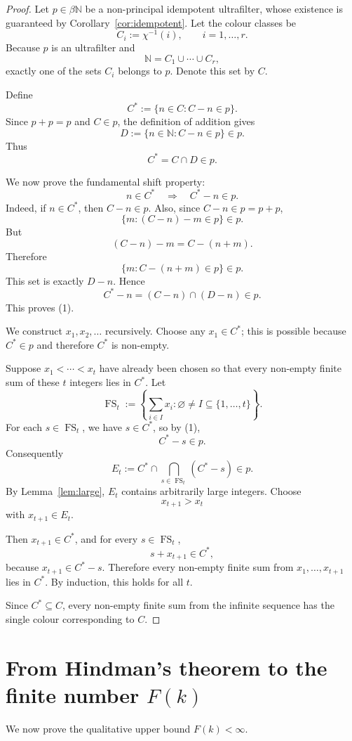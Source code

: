 \documentclass[11pt]{article}
\newcommand{\NN}{\mathbb N}
\newcommand{\FS}{\operatorname{FS}}
\begin{document}
\begin{proof}
Let $p\in\beta\NN$ be a non-principal idempotent ultrafilter, whose existence is guaranteed by Corollary~\ref{cor:idempotent}. Let the colour classes be
\[
    C_i:=\chi^{-1}(i),\qquad i=1,
\ldots,r.
\]
Because $p$ is an ultrafilter and
\[
    \NN=C_1\cup\cdots\cup C_r,
\]
exactly one of the sets $C_i$ belongs to $p$. Denote this set by $C$.

Define
\[
    C^*:=\{n\in C:C-n\in p\}.
\]
Since $p+p=p$ and $C\in p$, the definition of addition gives
\[
    D:=\{n\in\NN:C-n\in p\}\in p.
\]
Thus
\[
    C^*=C\cap D\in p.
\]

We now prove the fundamental shift property:
\[
    n\in C^* \quad\Longrightarrow\quad C^*-n\in p.       \tag{1}
\]
Indeed, if $n\in C^*$, then $C-n\in p$. Also, since $C-n\in p=p+p$,
\[
    \{m:(C-n)-m\in p\}\in p.
\]
But
\[
    (C-n)-m=C-(n+m).
\]
Therefore
\[
    \{m:C-(n+m)\in p\}\in p.
\]
This set is exactly $D-n$. Hence
\[
    C^*-n=(C-n)\cap(D-n)\in p.
\]
This proves (1).

We construct $x_1,x_2,\ldots$ recursively. Choose any $x_1\in C^*$; this is possible because $C^*\in p$ and therefore $C^*$ is non-empty.

Suppose $x_1<\cdots<x_t$ have already been chosen so that every non-empty finite sum of these $t$ integers lies in $C^*$. Let
\[
    \FS_t:=\left\{\sum_{i\in I}x_i:\varnothing\neq I\subseteq\{1,\ldots,t\}\right\}.
\]
For each $s\in\FS_t$, we have $s\in C^*$, so by (1),
\[
    C^*-s\in p.
\]
Consequently
\[
    E_t:=C^*\cap\bigcap_{s\in\FS_t}(C^*-s)\in p.
\]
By Lemma~\ref{lem:large}, $E_t$ contains arbitrarily large integers. Choose
\[
    x_{t+1}>x_t
\]
with $x_{t+1}\in E_t$.

Then $x_{t+1}\in C^*$, and for every $s\in\FS_t$,
\[
    s+x_{t+1}\in C^*,
\]
because $x_{t+1}\in C^*-s$. Therefore every non-empty finite sum from $x_1,\ldots,x_{t+1}$ lies in $C^*$. By induction, this holds for all $t$.

Since $C^*\subseteq C$, every non-empty finite sum from the infinite sequence has the single colour corresponding to $C$.
\end{proof}

\section{From Hindman's theorem to the finite number \texorpdfstring{$F(k)$}{F(k)}}

We now prove the qualitative upper bound $F(k)<\infty$.
\end{document}
